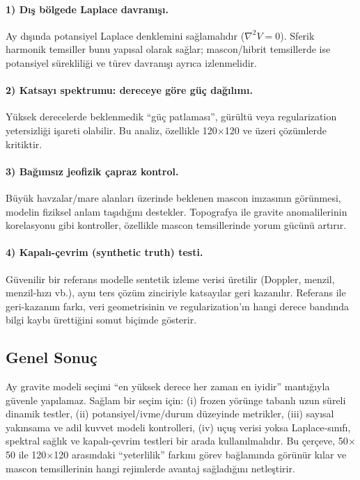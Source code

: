 \paragraph{1) Dış bölgede Laplace davranışı.}
Ay dışında potansiyel Laplace denklemini sağlamalıdır ($\nabla^2 V=0$).
Sferik harmonik temsiller bunu yapısal olarak sağlar;
mascon/hibrit temsillerde ise potansiyel sürekliliği ve türev davranışı ayrıca izlenmelidir.

\paragraph{2) Katsayı spektrumu: dereceye göre güç dağılımı.}
Yüksek derecelerde beklenmedik ``güç patlaması'',
gürültü veya regularization yetersizliği işareti olabilir.
Bu analiz, özellikle 120$\times$120 ve üzeri çözümlerde kritiktir.

\paragraph{3) Bağımsız jeofizik çapraz kontrol.}
Büyük havzalar/mare alanları üzerinde beklenen mascon imzasının görünmesi,
modelin fiziksel anlam taşıdığını destekler.
Topografya ile gravite anomalilerinin korelasyonu gibi kontroller,
özellikle mascon temsillerinde yorum gücünü artırır.

\paragraph{4) Kapalı-çevrim (synthetic truth) testi.}
Güvenilir bir referans modelle sentetik izleme verisi üretilir
(Doppler, menzil, menzil-hızı vb.), aynı ters çözüm zinciriyle katsayılar geri kazanılır.
Referans ile geri-kazanım farkı,
veri geometrisinin ve regularization'ın hangi derece bandında bilgi kaybı ürettiğini somut biçimde gösterir.

\subsection{Genel Sonuç}

Ay gravite modeli seçimi ``en yüksek derece her zaman en iyidir'' mantığıyla güvenle yapılamaz.
Sağlam bir seçim için:
(i) frozen yörünge tabanlı uzun süreli dinamik testler,
(ii) potansiyel/ivme/durum düzeyinde metrikler,
(iii) sayısal yakınsama ve adil kuvvet modeli kontrolleri,
(iv) uçuş verisi yoksa Laplace-sınıfı, spektral sağlık ve kapalı-çevrim testleri
bir arada kullanılmalıdır.
Bu çerçeve, 50$\times$50 ile 120$\times$120 arasındaki ``yeterlilik'' farkını görev bağlamında görünür kılar
ve mascon temsillerinin hangi rejimlerde avantaj sağladığını netleştirir.
